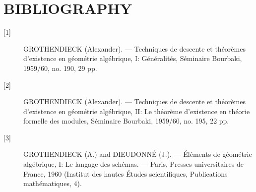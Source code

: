 \section*{BIBLIOGRAPHY}

\begin{description}
\item[{[1]}] GROTHENDIECK (Alexander). --- Techniques de descente et théorèmes
d'existence en géométrie algébrique, I: Généralités, Séminaire Bourbaki,
1959/60, no. 190, 29 pp.

\item[{[2]}] GROTHENDIECK (Alexander). --- Techniques de descente et théorèmes
d'existence en géométrie algébrique, II: Le théorème d'existence en théorie
formelle des modules, Séminaire Bourbaki, 1959/60, no. 195, 22 pp.

\item[{[3]}] GROTHENDIECK (A.) and DIEUDONNÉ (J.). --- Éléments de géométrie
algébrique, I: Le langage des schémas. --- Paris, Presses universitaires de
France, 1960 (Institut des hautes Études scientifiques, Publications
mathématiques, 4).
\end{description}

\par\smallskip
\begingroup\footnotesize
\endgroup
